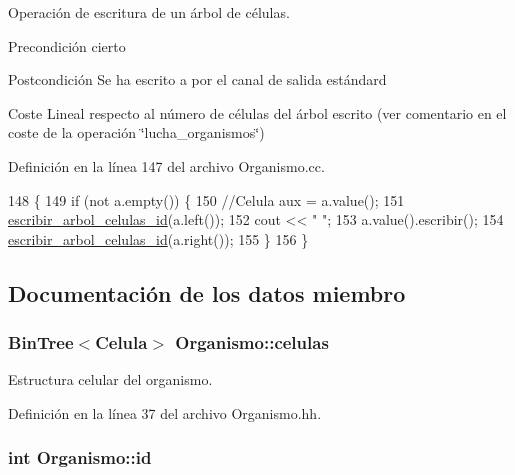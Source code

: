 Operación de escritura de un árbol de células. 

\begin{DoxyPrecond}{Precondición}
cierto 
\end{DoxyPrecond}
\begin{DoxyPostcond}{Postcondición}
Se ha escrito a por el canal de salida estándard 
\end{DoxyPostcond}
\begin{DoxyParagraph}{Coste}
Lineal respecto al número de células del árbol escrito (ver comentario en el coste de la operación \char`\"{}lucha\+\_\+organismos\char`\"{}) 
\end{DoxyParagraph}


Definición en la línea 147 del archivo Organismo.\+cc.


\begin{DoxyCode}
148 \{
149   \textcolor{keywordflow}{if} (not a.empty()) \{
150     \textcolor{comment}{//Celula aux = a.value();}
151     \hyperlink{class_organismo_a5ab26bf4286897ed99ebda39859bbf32}{escribir\_arbol\_celulas\_id}(a.left());
152     cout << \textcolor{stringliteral}{" "};
153     a.value().escribir();
154     \hyperlink{class_organismo_a5ab26bf4286897ed99ebda39859bbf32}{escribir\_arbol\_celulas\_id}(a.right());
155   \}
156 \}
\end{DoxyCode}


\subsection{Documentación de los datos miembro}
\subsubsection[{\texorpdfstring{celulas}{celulas}}]{\setlength{\rightskip}{0pt plus 5cm}Bin\+Tree$<${\bf Celula}$>$ Organismo\+::celulas\hspace{0.3cm}{\ttfamily [private]}}\hypertarget{class_organismo_a61023138644fc72610fc99189d3ba2ff}{}\label{class_organismo_a61023138644fc72610fc99189d3ba2ff}


Estructura celular del organismo. 



Definición en la línea 37 del archivo Organismo.\+hh.

\subsubsection[{\texorpdfstring{id}{id}}]{\setlength{\rightskip}{0pt plus 5cm}int Organismo\+::id\hspace{0.3cm}{\ttfamily [private]}}\hypertarget{class_organismo_a30be1823d3711fec651a5a4b1dc1cee5}{}\label{class_organismo_a30be1823d3711fec651a5a4b1dc1cee5}


